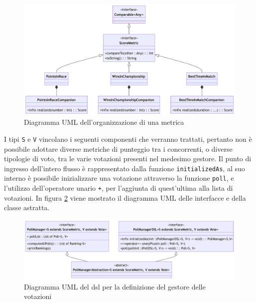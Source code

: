 \documentclass[12pt,a4paper,openright,twoside]{book}
\begin{document}
\vfill
\begin{center} 
\begin{figure}[H]
    \centering
     \includegraphics[width=1.1\linewidth]{figures/scoremetric.pdf}
     \caption{Diagramma UML dell'organizzazione di una metrica}
    \label{fig:metrica}
 \end{figure}
\end{center}
\vfill

I tipi \texttt{S} e \texttt{V} vincolano i seguenti componenti che verranno trattati, pertanto non è possibile adottare diverse metriche di punteggio tra i concorrenti,
o diverse tipologie di voto, tra le varie votazioni presenti nel medesimo gestore.
Il punto di ingresso dell'intero flusso è rappresentato dalla funzione \texttt{initializedAs}, al suo interno è possibile inizializzare una votazione attraverso 
la funzione \texttt{poll}, e l'utilizzo dell'operatore unario \texttt{+}, per l'aggiunta di quest'ultima alla lista di votazioni.
In figura \ref{fig:pollManagerDSL} viene mostrato il diagramma UML delle interfacce e della classe astratta.
\vfill
\begin{center} 
\begin{figure}[H]
    \centering
     \includegraphics[width=1.1\linewidth]{figures/pollManagerDSL.pdf}
     \caption{Diagramma UML del \ac{dsl} per la definizione del gestore delle votazioni}
    \label{fig:pollManagerDSL}
 \end{figure}
\end{center}
\vfill
 \newpage
\end{document}
